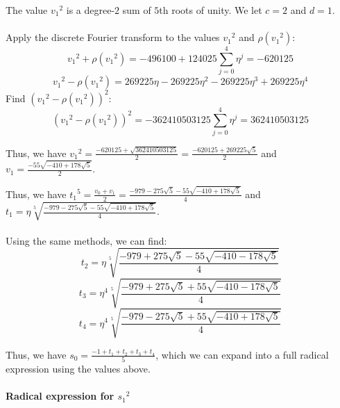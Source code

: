 \documentclass{article}
\begin{document}
\begin{adjustwidth}{1cm}{}
\begin{adjustwidth}{1cm}{}
\begin{adjustwidth}{1cm}{}
                    The value $ {v_1}^2 $ is a degree-$ 2 $ sum of $ 5 $th roots of unity. We let $ c = 2 $ and $ d = 1 $.\\
                    \\
                    Apply the discrete Fourier transform to the values $ {v_1}^2 $ and $ \rho({v_1}^2) $:
                    $$ {v_1}^2 + \rho({v_1}^2) = -496100 + 124025\sum_{j = 0}^4 \eta^j = -620125 $$
                    $$ {v_1}^2 - \rho({v_1}^2) = 269225 \eta - 269225 \eta^2 - 269225 \eta^3 + 269225 \eta^4 $$
                    Find $ ({v_1}^2 - \rho({v_1}^2))^2 $:
                    $$ ({v_1}^2 - \rho({v_1}^2))^2 = -362410503125\sum_{j = 0}^4 \eta^j = 362410503125 $$
                \end{adjustwidth}
                Thus, we have $ {v_1}^2 = \frac{-620125 + \sqrt{362410503125}}{2} = \frac{-620125+269225 \sqrt{5}}{2} $ and $ v_1 = \frac{-55 \sqrt{-410+178 \sqrt{5}}}{2} $.\\
            \end{adjustwidth}
            Thus, we have $ {t_1}^5 = \frac{v_0 + v_1}{2} = \frac{-979-275 \sqrt{5}-55 \sqrt{-410+178 \sqrt{5}}}{4} $ and $ t_1 = \eta \sqrt[5]{\frac{-979-275 \sqrt{5}-55 \sqrt{-410+178 \sqrt{5}}}{4}} $.\\
            \\
            Using the same methods, we can find:
            $$ t_2 = \eta \sqrt[5]{\frac{-979+275 \sqrt{5}-55 \sqrt{-410-178 \sqrt{5}}}{4}} $$
            $$ t_3 = \eta^4 \sqrt[5]{\frac{-979+275 \sqrt{5}+55 \sqrt{-410-178 \sqrt{5}}}{4}} $$
            $$ t_4 = \eta^4 \sqrt[5]{\frac{-979-275 \sqrt{5}+55 \sqrt{-410+178 \sqrt{5}}}{4}} $$
        \end{adjustwidth}
        Thus, we have $ s_0 = \frac{-1 + t_1 + t_2 + t_3 + t_4}{5} $, which we can expand into a full radical expression using the values above.\\
        \\
        \textbf{Radical expression for $ {s_1}^2 $}\\
\end{document}
